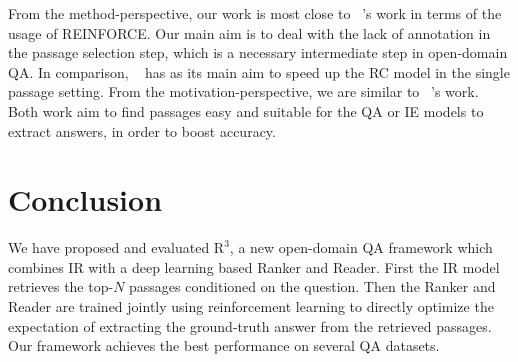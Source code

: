 \documentclass[letterpaper]{article} \usepackage{aaai18}  \usepackage{times}  \usepackage{helvet}  \usepackage{courier}  \usepackage{url}  \usepackage{graphicx}  \usepackage{comment}
\begin{document}
From the method-perspective, our work is most close to \citeauthor{choi2017coarse}~\citeyear{choi2017coarse}'s work in terms of the usage of REINFORCE. Our main aim is to deal with the lack of annotation in the passage selection step, which is a necessary intermediate step in open-domain QA. In comparison, \citeauthor{choi2017coarse}~\citeyear{choi2017coarse} has as its main aim to speed up the RC model in the single passage setting. 
From the motivation-perspective, we are similar to \citeauthor{narasimhan-yala-barzilay:2016:EMNLP2016}~\citeyear{narasimhan-yala-barzilay:2016:EMNLP2016}'s work. Both work aim to find passages easy and suitable for the QA or IE models to extract answers, in order to boost accuracy.

\section{Conclusion}
We have proposed and evaluated $\text{R}^3$, a new open-domain QA framework which combines IR with a deep learning based Ranker and Reader. First the IR model retrieves the top-$N$ passages conditioned on the question. Then the  Ranker and Reader are trained jointly using reinforcement learning to directly optimize the expectation of extracting the ground-truth answer from the retrieved passages.
Our framework achieves the best performance on several QA datasets. 




\end{document}
